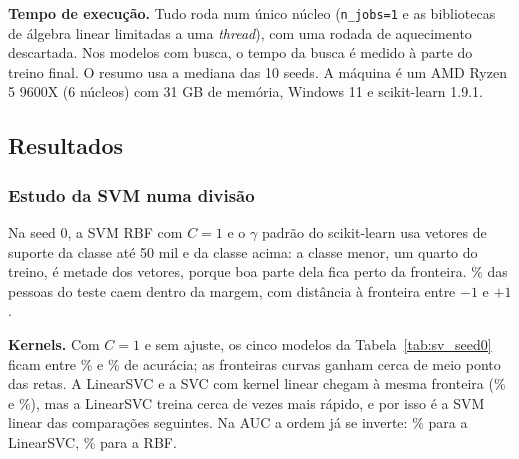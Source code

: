 \begin{table}[ht]
\centering
\caption{Grades da busca (número de combinações após os dois-pontos) e o que a busca escolheu nas 10 seeds.}
\label{tab:sv_grades}
\footnotesize

\end{table}

\textbf{Tempo de execução.} Tudo roda num único núcleo (\texttt{n\_jobs=1} e as bibliotecas de álgebra linear limitadas a uma \emph{thread}), com uma rodada de aquecimento descartada. Nos modelos com busca, o tempo da busca é medido à parte do treino final. O resumo usa a mediana das 10 seeds. A máquina é um AMD Ryzen 5 9600X (6 núcleos) com 31 GB de memória, Windows 11 e scikit-learn 1.9.1.

\subsection{Resultados}\label{sec:sv_resultados}

\subsubsection{Estudo da SVM numa divisão}\label{sec:sv_estudo}

Na seed 0, a SVM RBF com $C = 1$ e o $\gamma$ padrão do scikit-learn usa \svVetNeg{} vetores de suporte da classe até 50 mil e \svVetPos{} da classe acima: a classe menor, um quarto do treino, é metade dos vetores, porque boa parte dela fica perto da fronteira. \svMargem\% das pessoas do teste caem dentro da margem, com distância à fronteira entre $-1$ e $+1$.

\textbf{Kernels.} Com $C = 1$ e sem ajuste, os cinco modelos da Tabela~\ref{tab:sv_seed0} ficam entre \svKSVCLin\% e \svKPoliTres\% de acurácia; as fronteiras curvas ganham cerca de meio ponto das retas. A LinearSVC e a SVC com kernel linear chegam à mesma fronteira (\svKLinSVC\% e \svKSVCLin\%), mas a LinearSVC treina cerca de \svRazaoLinear{} vezes mais rápido, e por isso é a SVM linear das comparações seguintes. Na AUC a ordem já se inverte: \svKAucLinSVC\% para a LinearSVC, \svKAucRBF\% para a RBF.

\begin{table}[ht]
\centering
\caption{Seed 0: os kernels com $C = 1$ e o efeito da padronização (\svTreino{} pessoas no treino, \svTeste{} no teste).}
\label{tab:sv_seed0}
\footnotesize

\end{table}

